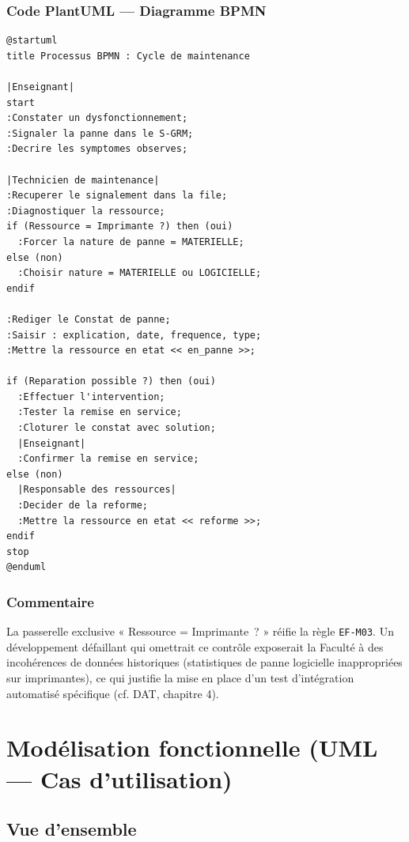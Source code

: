 \documentclass[a4paper,11pt,openany]{report}
\begin{document}
\subsection{Code PlantUML --- Diagramme BPMN}

\begin{lstlisting}[caption={Processus BPMN --- Maintenance},
                   label={lst:bpmnMaintenance}]
@startuml
title Processus BPMN : Cycle de maintenance

|Enseignant|
start
:Constater un dysfonctionnement;
:Signaler la panne dans le S-GRM;
:Decrire les symptomes observes;

|Technicien de maintenance|
:Recuperer le signalement dans la file;
:Diagnostiquer la ressource;
if (Ressource = Imprimante ?) then (oui)
  :Forcer la nature de panne = MATERIELLE;
else (non)
  :Choisir nature = MATERIELLE ou LOGICIELLE;
endif

:Rediger le Constat de panne;
:Saisir : explication, date, frequence, type;
:Mettre la ressource en etat << en_panne >>;

if (Reparation possible ?) then (oui)
  :Effectuer l'intervention;
  :Tester la remise en service;
  :Cloturer le constat avec solution;
  |Enseignant|
  :Confirmer la remise en service;
else (non)
  |Responsable des ressources|
  :Decider de la reforme;
  :Mettre la ressource en etat << reforme >>;
endif
stop
@enduml
\end{lstlisting}

\subsection{Commentaire}

La passerelle exclusive « Ressource = Imprimante~? » réifie la
règle \texttt{EF-M03}. Un développement défaillant qui omettrait
ce contrôle exposerait la Faculté à des incohérences de données
historiques (statistiques de panne logicielle inappropriées sur
imprimantes), ce qui justifie la mise en place d'un test
d'intégration automatisé spécifique (cf. DAT, chapitre 4).

\chapter{Modélisation fonctionnelle (UML --- Cas d'utilisation)}

\section{Vue d'ensemble}
\end{document}

